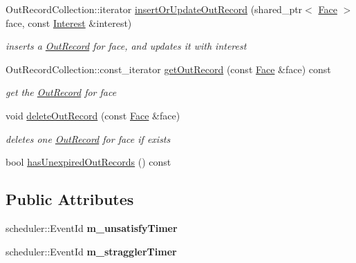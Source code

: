\begin{DoxyCompactItemize}
\item 
Out\+Record\+Collection\+::iterator \hyperlink{classnfd_1_1pit_1_1Entry_a9fd6defe6d91d3d57138a8c9bfdc8ddd}{insert\+Or\+Update\+Out\+Record} (shared\+\_\+ptr$<$ \hyperlink{classnfd_1_1Face}{Face} $>$ face, const \hyperlink{classndn_1_1Interest}{Interest} \&interest)
\begin{DoxyCompactList}\small\item\em inserts a \hyperlink{classnfd_1_1pit_1_1OutRecord}{Out\+Record} for face, and updates it with interest \end{DoxyCompactList}\item 
Out\+Record\+Collection\+::const\+\_\+iterator \hyperlink{classnfd_1_1pit_1_1Entry_a3b2bbe9f81ed02b1b522de4ae1b101ab}{get\+Out\+Record} (const \hyperlink{classnfd_1_1Face}{Face} \&face) const
\begin{DoxyCompactList}\small\item\em get the \hyperlink{classnfd_1_1pit_1_1OutRecord}{Out\+Record} for face \end{DoxyCompactList}\item 
void \hyperlink{classnfd_1_1pit_1_1Entry_af7fc8db88c255d484690378774a3a8c8}{delete\+Out\+Record} (const \hyperlink{classnfd_1_1Face}{Face} \&face)\hypertarget{classnfd_1_1pit_1_1Entry_af7fc8db88c255d484690378774a3a8c8}{}\label{classnfd_1_1pit_1_1Entry_af7fc8db88c255d484690378774a3a8c8}

\begin{DoxyCompactList}\small\item\em deletes one \hyperlink{classnfd_1_1pit_1_1OutRecord}{Out\+Record} for face if exists \end{DoxyCompactList}\item 
bool \hyperlink{classnfd_1_1pit_1_1Entry_a98f2f64a29c982eb9e3ac0173b4c20b9}{has\+Unexpired\+Out\+Records} () const
\end{DoxyCompactItemize}
\subsection*{Public Attributes}
\begin{DoxyCompactItemize}
\item 
scheduler\+::\+Event\+Id {\bfseries m\+\_\+unsatisfy\+Timer}\hypertarget{classnfd_1_1pit_1_1Entry_ae2c4ba5d14049840562b44f7d36e9d14}{}\label{classnfd_1_1pit_1_1Entry_ae2c4ba5d14049840562b44f7d36e9d14}

\item 
scheduler\+::\+Event\+Id {\bfseries m\+\_\+straggler\+Timer}\hypertarget{classnfd_1_1pit_1_1Entry_ad16187530400eb31882cb176a46c8fcd}{}\label{classnfd_1_1pit_1_1Entry_ad16187530400eb31882cb176a46c8fcd}

\end{DoxyCompactItemize}
